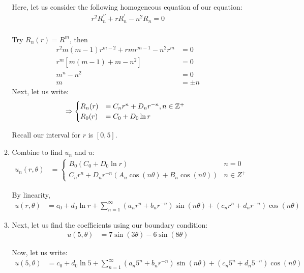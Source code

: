 \documentclass{article}
\begin{document}
\begin{enumerate}
\begin{enumerate}
    Here, let us consider the following homogeneous equation of our equation:
    \begin{align}
      r^2 R^{\prime\prime}_n + rR^\prime_n - n^2 R_n = 0\\
    \end{align}

    Try $R_n(r) = R^m$, then
    \begin{align}
      r^2 m( m - 1) r^{m - 2} + r mr^{m - 1} - n^2 r^m & = 0\\
      r^m \left[ m( m - 1) + m - n^2 \right] & = 0\\
      m^n - n^2 & = 0\\
      m & = \pm n
    \end{align}
    Next, let us write:
    \begin{align}
      & \Rightarrow
      \begin{cases}
        R_n(r) & = C_n r^n + D_n r^{-n}, n \in \mathbb Z^+\\
        R_0(r) & = C_0 + D_0 \ln r
      \end{cases}
    \end{align}

    Recall our interval for $r$ is $[0, 5]$.
    \item Combine to find $u_n$ and $u$:
    \begin{align}
      u_n(r, \theta) & =
      \begin{cases}
        B_0( C_0 + D_0 \ln r) & n = 0\\
        C_nr^n + D_n r^{-n}\left(A_n \cos(n \theta) + B_n \cos(n \theta) \right) & n \in Z^+
      \end{cases}
    \end{align}

    By linearity,
    \begin{align}
      u(r, \theta) & = c_0 + d_0 \ln r + \sum^\infty_{n = 1} (a_nr^n + b_nr^{-n}) \sin(n \theta) + (c_nr^n + d_nr^{-n}) \cos(n \theta)
    \end{align}

    \item Next, let us find the coefficients using our boundary condition:
    \begin{align}
      u(5, \theta) & = 7 \sin(3 \theta) - 6\sin(8 \theta)
    \end{align}

    Now, let us write:
    \begin{align}
      u(5, \theta) & = c_0 + d_0 \ln 5 + \sum^\infty_{n = 1} (a_n 5^n + b_n r^{-n}) \sin(n \theta) + (c_n 5^n + d_n 5^{-n}) \cos(n \theta)
    \end{align}


\end{enumerate}
\end{enumerate}
\end{document}
